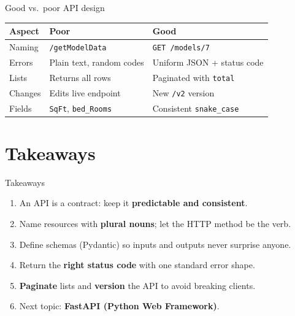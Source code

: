 \documentclass[aspectratio=169,10pt]{beamer}
\begin{document}
\begin{frame}{Good vs.\ poor API design}
\begin{center}
\begin{tabular}{p{3.6cm}p{4.2cm}p{4.2cm}}
\toprule
\textbf{Aspect} & \textbf{Poor} & \textbf{Good} \\
\midrule
\rowcolor{mlblue!8}  Naming & \texttt{/getModelData} & \texttt{GET /models/7} \\
Errors & Plain text, random codes & Uniform JSON + status code \\
\rowcolor{mlblue!8}  Lists & Returns all rows & Paginated with \texttt{total} \\
Changes & Edits live endpoint & New \texttt{/v2} version \\
\rowcolor{mlblue!8}  Fields & \texttt{SqFt}, \texttt{bed\_Rooms} & Consistent \texttt{snake\_case} \\
\bottomrule
\end{tabular}
\end{center}
\end{frame}

\section{Takeaways}

\begin{frame}{Takeaways}
\begin{enumerate}
\item An API is a contract: keep it \textbf{predictable and consistent}.
\item Name resources with \textbf{plural nouns}; let the HTTP method be the verb.
\item Define schemas (Pydantic) so inputs and outputs never surprise anyone.
\item Return the \textbf{right status code} with one standard error shape.
\item \textbf{Paginate} lists and \textbf{version} the API to avoid breaking clients.
\item Next topic: \textbf{FastAPI (Python Web Framework)}.
\end{enumerate}
\end{frame}
\end{document}
